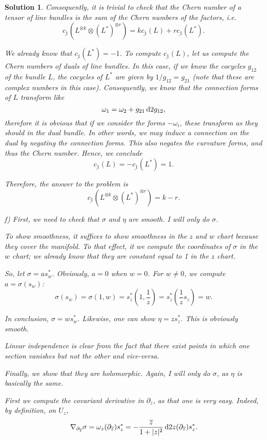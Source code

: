 \documentclass{article}
\theoremstyle{nonumberplain}
\newtheorem{sol}{Solution}
\DeclarePairedDelimiter{\abs}{\lvert}{\rvert}
\begin{document}
\begin{sol}
Consequently, it is trivial to check that the Chern number of a tensor of line bundles is the sum of the Chern numbers of the factors, i.e.
\[\underline{c_1}(L^{\otimes k} \otimes (L^*)^{\otimes r}) = k \underline{c_1}(L) + r \underline{c_1}(L^*).\]

We already know that $\underline{c_1}(L^*) = -1$. To compute $\underline{c_1}(L)$, let us compute the Chern numbers of duals of line bundles. In this case, if we know the cocycles $g_{12}$ of the bundle $L$, the cocycles of $L^*$ are given by $1/g_{12} = g_{21}$ (note that these are complex numbers in this case). Consequently, we know that the connection forms of $L$ transform like
\[\omega_1 = \omega_2 + g_{21} \dl2 g_{12},\]
therefore it is obvious that if we consider the forms $-\omega_i$, these transform as they should in the dual bundle. In other words, we may induce a connection on the dual by negating the connection forms. This also negates the curvature forms, and thus the Chern number. Hence, we conclude
\[\underline{c_1}(L) = -\underline{c_1}(L^*) = 1.\]

Therefore, the answer to the problem is
\[\underline{c_1}(L^{\otimes k} \otimes (L^*)^{\otimes r}) = k - r.\]

\medskip

f) First, we need to check that $\sigma$ and $\eta$ are smooth. I will only do $\sigma$.

To show smoothness, it suffices to show smoothness in the $z$ and $w$ chart because they cover the manifold. To that effect, it we compute the coordinates of $\sigma$ in the $w$ chart; we already know that they are constant equal to 1 in the $z$ chart.

So, let $\sigma = a s^*_w$. Obviously, $a = 0$ when $w=0$. For $w \neq 0$, we compute $a = \sigma(s_w)$:
\[\sigma(s_w) = \sigma(1,w) = s^*_z(1,\frac1z) = s^*_z(\frac1z s_z) = w.\]

In conclusion, $\sigma = w s^*_w$. Likewise, one can show $\eta = z s^*_z$. This is obviously smooth.

Linear independence is clear from the fact that there exist points in which one section vanishes but not the other and vice-versa.

Finally, we show that they are holomorphic. Again, I will only do $\sigma$, as $\eta$ is basically the same.

First we compute the covariant derivative in $\partial_{\overline{z}}$, as that one is very easy. Indeed, by definition, on $U_z$,
\[\nabla_{\partial_{\overline{z}}} \sigma = \omega_z(\partial_{\overline{z}}) s^*_z = -\frac{\overline{z}}{1+\abs{z}^2} \dl2z(\partial_{\overline{z}}) s^*_z.\]


\end{sol}
\end{document}
